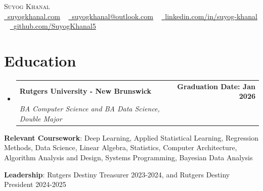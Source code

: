 \documentclass[letterpaper,11pt]{article}
\makeatletter
\newcommand{\resumeSubheading}[4]{
  \vspace{-2pt}\item
    \begin{tabular*}{1.0\textwidth}[t]{l@{\extracolsep{\fill}}r}
      \textbf{#1} & \textbf{\small #2} \\
      \textit{\small#3} & \textit{\small #4} \\
    \end{tabular*}\vspace{-7pt}
}
\newcommand{\resumeSubHeadingListStart}{\begin{itemize}[leftmargin=0.0in, label={}]}
\newcommand{\resumeSubHeadingListEnd}{\end{itemize}}
\makeatother
\begin{document}
\begin{center}
    {\Huge \scshape Suyog Khanal} \\ \vspace{4pt}
    \small \href{https://suyogkhanal.com/}{\raisebox{-0.2\height}\faGlobe\ \underline{suyogkhanal.com}} ~ \href{mailto:suyogkhanal@outlook.com} {\raisebox{-0.2\height}\faEnvelope\  \underline{suyogkhanal@outlook.com}} ~ \href{https://www.linkedin.com/in/suyog-khanal}{\raisebox{-0.2\height}\faLinkedin\ \underline{linkedin.com/in/suyog-khanal}}  ~
    \href{https://github.com/SuyogKhanal5}{\raisebox{-0.2\height}\faGithub\ \underline{github.com/SuyogKhanal5}}
    \vspace{-8pt}
\end{center}


\section{Education}
  \resumeSubHeadingListStart
    \resumeSubheading
      {Rutgers University - New Brunswick}{Graduation Date: Jan 2026}
      {BA Computer Science and BA Data Science, Double Major}{}
  \resumeSubHeadingListEnd
  \begin{itemize}[leftmargin=0.00in, label={}]
    \small{\item{
     \textbf{Relevant Coursework}{: Deep Learning, Applied Statistical Learning, Regression Methods, Data Science, Linear Algebra, Statistics, Computer Architecture, Algorithm Analysis and Design, Systems Programming, Bayesian Data Analysis}
    }}
    \vspace{-4pt}
    \small{\item{
     \textbf{Leadership}{: Rutgers Destiny Treasurer 2023-2024, and Rutgers Destiny President 2024-2025}
    }}
 \end{itemize}

     \vspace{-15pt}

\end{document}
